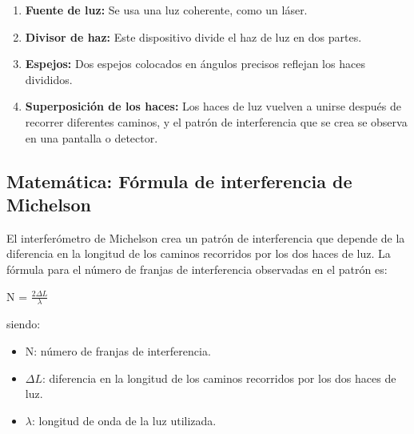 \documentclass[a4paper]{article}
\begin{document}
		\begin{enumerate}
			\item \textbf{Fuente de luz:} Se usa una luz coherente, como un láser.
			\item \textbf{Divisor de haz:} Este dispositivo divide el haz de luz en dos partes.
			\item \textbf{Espejos:} Dos espejos colocados en ángulos precisos reflejan los haces divididos.
			\item \textbf{Superposición de los haces:} Los haces de luz vuelven a unirse después de recorrer diferentes caminos, y el patrón de interferencia que se crea se observa en una pantalla o detector.
		\end{enumerate}
		
		\subsection{Matemática: Fórmula de interferencia de Michelson}
		
		El interferómetro de Michelson crea un patrón de interferencia que depende de la diferencia en la longitud de los caminos recorridos por los dos haces de luz. La fórmula para el número de franjas de interferencia observadas en el patrón es:
		
		\begin{center}
			N = $\frac{2 \Delta L}{\lambda}$ \\
		\end{center}
		
		siendo:
		\begin{itemize}
			\item N: número de franjas de interferencia.
			\item $\Delta L$: diferencia en la longitud de los caminos recorridos por los dos haces de luz.
			\item $\lambda$: longitud de onda de la luz utilizada.
		\end{itemize}
		
\end{document}

